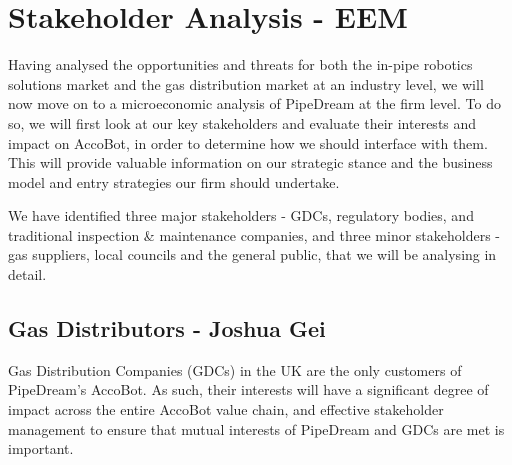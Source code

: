 \documentclass[11pt]{article}		%
\begin{document}
	\section{Stakeholder Analysis - EEM}

		Having analysed the opportunities and threats for both the in-pipe robotics solutions market and the gas distribution market at an industry level, we will now move on to a microeconomic analysis of PipeDream at the firm level. To do so, we will first look at our key stakeholders and evaluate their interests and impact on AccoBot, in order to determine how we should interface with them. This will provide valuable information on our strategic stance and the business model and entry strategies our firm should undertake.
		
		We have identified three major stakeholders - GDCs, regulatory bodies, and traditional inspection \& maintenance companies, and three minor stakeholders - gas suppliers, local councils and the general public, that we will be analysing in detail. 
		
		
		
		\subsection[Gas Distributors]{Gas Distributors - Joshua Gei} \label{GDCstakeholders}
	
		Gas Distribution Companies (GDCs) in the UK are the only customers of PipeDream’s AccoBot. As such, their interests will have a significant degree of impact across the entire AccoBot value chain, and effective stakeholder management to ensure that mutual interests of PipeDream and GDCs are met is important. 
	
\end{document}
